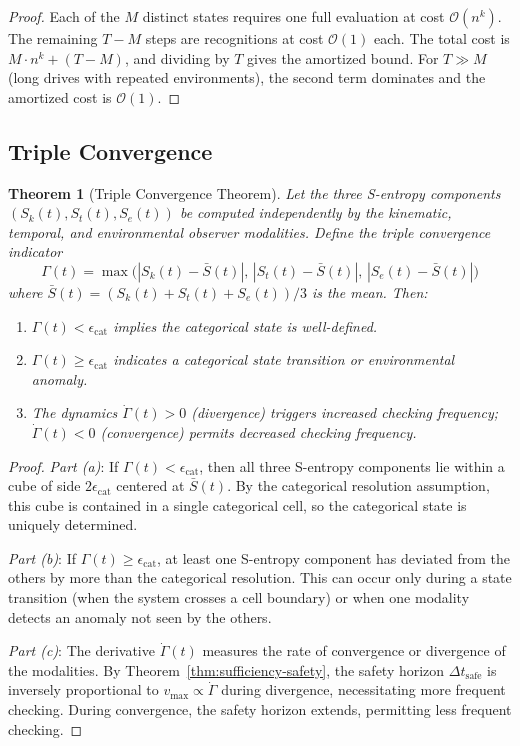 \documentclass[twocolumn,10pt]{article}
\newtheorem{theorem}{Theorem}[section]
\theoremstyle{definition}
\theoremstyle{remark}
\newcommand{\Ocal}{\mathcal{O}}
\begin{document}
\begin{proof}
Each of the $M$ distinct states requires one full evaluation at cost
$\Ocal(n^k)$. The remaining $T - M$ steps are recognitions at cost
$\Ocal(1)$ each. The total cost is $M \cdot n^k + (T - M)$, and dividing
by $T$ gives the amortized bound. For $T \gg M$ (long drives with repeated
environments), the second term dominates and the amortized cost is $\Ocal(1)$.
\end{proof}

\subsection{Triple Convergence}

\begin{theorem}[Triple Convergence Theorem]\label{thm:triple-convergence}
Let the three S-entropy components $(S_k(t), S_t(t), S_e(t))$ be computed
independently by the kinematic, temporal, and environmental observer
modalities. Define the \emph{triple convergence indicator}
\begin{equation}\label{eq:triple-convergence}
  \Gamma(t) = \max\!\big(|S_k(t) - \bar{S}(t)|, \,
  |S_t(t) - \bar{S}(t)|, \,
  |S_e(t) - \bar{S}(t)|\big)
\end{equation}
where $\bar{S}(t) = (S_k(t) + S_t(t) + S_e(t))/3$ is the mean. Then:
\begin{enumerate}[label=(\alph*)]
  \item $\Gamma(t) < \epsilon_{\mathrm{cat}}$ implies the categorical state
    is well-defined.
  \item $\Gamma(t) \geq \epsilon_{\mathrm{cat}}$ indicates a categorical
    state transition or environmental anomaly.
  \item The dynamics $\dot{\Gamma}(t) > 0$ (divergence) triggers increased
    checking frequency; $\dot{\Gamma}(t) < 0$ (convergence) permits
    decreased checking frequency.
\end{enumerate}
\end{theorem}

\begin{proof}
\emph{Part (a)}: If $\Gamma(t) < \epsilon_{\mathrm{cat}}$, then all three
S-entropy components lie within a cube of side $2\epsilon_{\mathrm{cat}}$
centered at $\bar{S}(t)$. By the categorical resolution assumption, this
cube is contained in a single categorical cell, so the categorical state
is uniquely determined.

\emph{Part (b)}: If $\Gamma(t) \geq \epsilon_{\mathrm{cat}}$, at least one
S-entropy component has deviated from the others by more than the
categorical resolution. This can occur only during a state transition
(when the system crosses a cell boundary) or when one modality detects an
anomaly not seen by the others.

\emph{Part (c)}: The derivative $\dot{\Gamma}(t)$ measures the rate of
convergence or divergence of the modalities. By
Theorem~\ref{thm:sufficiency-safety}, the safety horizon
$\Delta t_{\mathrm{safe}}$ is inversely proportional to $v_{\max} \propto
\dot{\Gamma}$ during divergence, necessitating more frequent checking. During
convergence, the safety horizon extends, permitting less frequent checking.
\end{proof}
\end{document}

